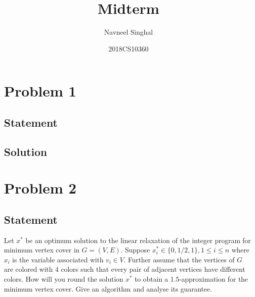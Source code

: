 \documentclass[a4paper]{article}
\title{\textbf{Midterm}}
\author{Navneel Singhal}
\date{2018CS10360}
\begin{document}
\maketitle
\tableofcontents


\newpage

\section{Problem 1}

\subsection{Statement}
\subsection{Solution}

\newpage

\section{Problem 2}

\subsection{Statement}

Let $x^*$ be an optimum solution to the linear relaxation of the integer program for minimum vertex cover in $G = (V, E)$. Suppose $x_i^* \in \{0,1/2,1\},1 \le i \le n$ where $x_i$ is the variable
associated with $v_i \in V$. Further assume that the vertices of $G$ are colored with $4$ colors such that every pair of adjacent vertices have different colors. How will you round the solution
$x^*$ to obtain a $1.5$-approximation for the minimum vertex cover. Give an algorithm and analyse its guarantee.
\end{document}
